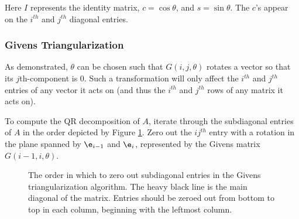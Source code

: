 Here $I$ represents the identity matrix, $c=\cos \theta$, and $s=\sin \theta$.
The $c$'s appear on the $i^{th}$ and $j^{th}$ diagonal entries.

\subsubsection*{Givens Triangularization} %

As demonstrated, $\theta$ can be chosen such that $G(i,j,\theta)$ rotates a vector so that its $j$th-component is 0.
Such a transformation will only affect the $i^{th}$ and $j^{th}$ entries of any vector it acts on (and thus the $i^{th}$ and $j^{th}$ rows of any matrix it acts on).

To compute the QR decomposition of $A$, iterate through the subdiagonal entries of $A$ in the order depicted by Figure \ref{fig:Givens-iteration-order}.
Zero out the $ij^{th}$ entry with a rotation in the plane spanned by $\e_{i-1}$ and $\e_i$, represented by the Givens matrix $G(i-1,i,\theta)$.

\begin{figure}[H]
\centering
{}
\caption{The order in which to zero out subdiagonal entries in the Givens triangularization algorithm.
The heavy black line is the main diagonal of the matrix.
Entries should be zeroed out from bottom to top in each column, beginning with the leftmost column.}
\label{fig:Givens-iteration-order}
\end{figure}

